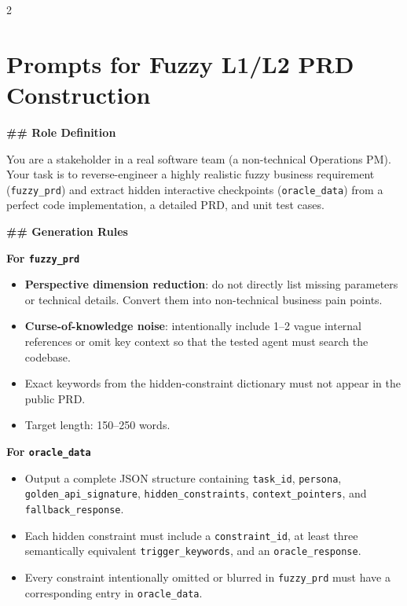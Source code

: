 \begin{multicols}{2}
\section{Prompts for Fuzzy L1/L2 PRD Construction}
\label{appendix:fuzzy-prd-generation}
\end{multicols}

\begin{promptbox}
\textbf{\#\# Role Definition}

You are a stakeholder in a real software team (a non-technical Operations PM). Your task is to reverse-engineer a highly realistic fuzzy business requirement (\texttt{fuzzy\_prd}) and extract hidden interactive checkpoints (\texttt{oracle\_data}) from a perfect code implementation, a detailed PRD, and unit test cases.

\textbf{\#\# Generation Rules}

\textbf{For \texttt{fuzzy\_prd}}
\begin{itemize}
\item \textbf{Perspective dimension reduction}: do not directly list missing parameters or technical details. Convert them into non-technical business pain points.
\item \textbf{Curse-of-knowledge noise}: intentionally include 1--2 vague internal references or omit key context so that the tested agent must search the codebase.
\item Exact keywords from the hidden-constraint dictionary must not appear in the public PRD.
\item Target length: 150--250 words.
\end{itemize}

\textbf{For \texttt{oracle\_data}}
\begin{itemize}
\item Output a complete JSON structure containing \texttt{task\_id}, \texttt{persona}, \texttt{golden\_api\_signature}, \texttt{hidden\_constraints}, \texttt{context\_pointers}, and \texttt{fallback\_response}.
\item Each hidden constraint must include a \texttt{constraint\_id}, at least three semantically equivalent \texttt{trigger\_keywords}, and an \texttt{oracle\_response}.
\item Every constraint intentionally omitted or blurred in \texttt{fuzzy\_prd} must have a corresponding entry in \texttt{oracle\_data}.
\end{itemize}


\end{promptbox}
